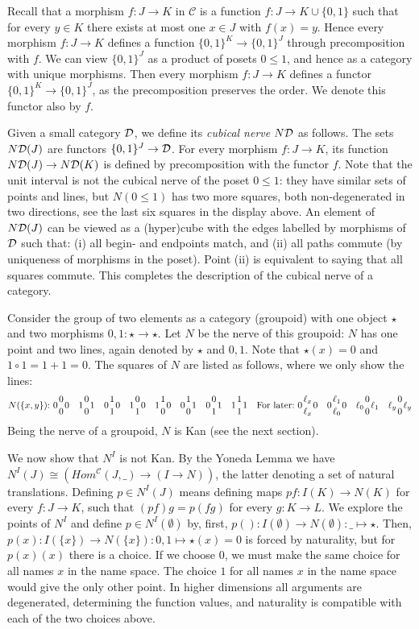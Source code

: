 \documentclass[10pt,a4paper]{article}
\newcommand{\CC}{{\mathcal C}}
\newcommand{\set}[1]{\{#1\}}
\begin{document}
Recall that a morphism $f:J\to K$ in $\CC$ is a function $f:J\to K\cup\set{0,1}$ such that
for every $y\in K$ there exists at most one $x\in J$ with $f(x)=y$.
Hence every morphism $f:J\to K$ defines a function
$\set{0,1}^K  \to \set{0,1}^J$ through precomposition with $f$.
We can view $\set{0,1}^J$ as a product of posets $0\leq1$,
and hence as a category with unique morphisms.
Then every morphism $f:J\to K$ defines a functor
$\set{0,1}^K  \to \set{0,1}^J$, as the precomposition preserves the order.
We denote this functor also by $f$.

\newcommand{\DD}{{\cal D}}
\newcommand{\ND}{N\DD}
Given a small category $\DD$, we define its \emph{cubical nerve}
$\ND$ as follows. The sets $\ND(J)$ are functors $\set{0,1}^J \to\DD$.
For every morphism $f:J\to K$, its function $\ND(J)\to\ND(K)$
is defined by precomposition with the functor $f$.
Note that the unit interval is not the cubical nerve of the poset $0\leq1$:
they have similar sets of points and lines, but $N(0\leq1)$ has two
more squares, both non-degenerated in two directions,
see the last six squares in the display above.
An element of $\ND(J)$ can be viewed as a (hyper)cube with
the edges labelled by morphisms of $\DD$ such that:
(i) all begin- and endpoints match, and
(ii) all paths commute (by uniqueness of morphisms in the poset).
Point (ii) is equivalent to saying that all squares commute.
This completes the description of the cubical nerve of a category.

Consider the group of two elements as a category (groupoid)
with one object $\star$ and two morphisms $0,1:\star\to\star$.
Let $N$ be the nerve of this groupoid:
$N$ has one point and two lines, again denoted by $\star$ and $0,1$.
Note that $\star(x) = 0$ and $1\circ 1 = 1+1=0$.
The squares of $N$ are listed as follows, where we only show the lines:
\[
\def\ol{{1 \atop 0}}
\def\oo{{0 \atop 0}}
\def\lo{{0 \atop 1}}
\def\ll{{1 \atop 1}}
N(\set{x,y}){:}~
0\oo0 \quad 1\oo1 \quad 0\ll0 \quad 1\lo0 \quad 1\ol0 \quad 0\ol1 \quad 0\lo1 \quad 1\ll1
\quad\mbox{For later:}~0{\ell_x \atop \ell_x}0 \quad 0{\ell_1 \atop \ell_0}0
\quad \ell_0{0 \atop 0}\ell_1 \quad \ell_y{0 \atop 0}\ell_y\]
Being the nerve of a groupoid, $N$ is Kan (see the next section).

We now show that $N^I$ is not Kan. By the Yoneda Lemma we have
$N^I(J)\cong (Hom^{\CC}(J,\_)\to (I\to N))$, the latter denoting a set
of natural translations.  Defining $p\in N^I(J)$ means defining maps
$pf:I(K)\to N(K)$ for every $f:J\to K$, such that $(pf)g=p(fg)$ for
every $g:K\to L$. We explore the points of $N^I$ and define $p\in
N^I(\emptyset)$ by, first, $p():I(\emptyset)\to
N(\emptyset):\_\mapsto\star$.  Then, $p(x):I(\set{x})\to N(\set{x}):
0,1 \mapsto\star(x)=0$ is forced by naturality, but for $p(x)(x)$
there is a choice. If we choose $0$, we must make the same choice for
all names $x$ in the name space.  The choice $1$ for all names $x$ in
the name space would give the only other point. In higher dimensions
all arguments are degenerated, determining the function values, and
naturality is compatible with each of the two choices above.
\end{document}
